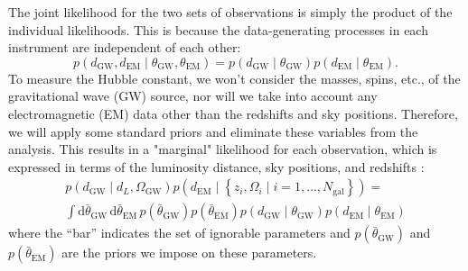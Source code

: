 \documentclass[modern]{article}
\newcommand{\dd}{\mathrm{d}}
\newcommand{\dEM}{d_{\mathrm{EM}}}
\newcommand{\dGW}{d_{\mathrm{GW}}}
\newcommand{\Ngal}{N_{\mathrm{gal}}}
\newcommand{\OGW}{\Omega_{\mathrm{GW}}}
\newcommand{\thetaEM}{\theta_{\mathrm{EM}}}
\newcommand{\thetaGW}{\theta_{\mathrm{GW}}}
\begin{document}
The joint likelihood for the two sets of observations is simply the product of the individual likelihoods. This is because the data-generating processes in each instrument are independent of each other:
%
\begin{equation}
    p\left( \dGW, \dEM \mid \thetaGW, \thetaEM \right) =  p\left( \dGW \mid \thetaGW \right) p\left( \dEM \mid \thetaEM \right).
\end{equation}
%
To measure the Hubble constant, we won't consider the masses, spins, etc., of the gravitational wave (GW) source, nor will we take into account any electromagnetic (EM) data other than the redshifts and sky positions. Therefore, we will apply some standard priors and eliminate these variables from the analysis. This results in a "marginal" likelihood for each observation, which is expressed in terms of the luminosity distance, sky positions, and redshifts \cite{Abbott2016Rate}:
%
\begin{multline}
    p\left( \dGW \mid d_L, \OGW \right) p\left( \dEM \mid \left\{ z_i, \Omega_i \mid i = 1, \ldots, \Ngal \right\} \right) = \\ \int \dd \bar{\theta}_{\mathrm{GW}} \, \dd \bar{\theta}_{\mathrm{EM}} \, p\left( \bar{\theta}_{\mathrm{GW}} \right) p\left( \bar{\theta}_{\mathrm{EM}} \right) p\left( \dGW \mid \thetaGW \right) p\left( \dEM \mid \thetaEM \right)
\end{multline}
%
where the ``bar'' indicates the set of ignorable parameters and $p\left(
\bar{\theta}_{\mathrm{GW}} \right)$ and $p\left( \bar{\theta}_{\mathrm{EM}}
\right)$ are the priors we impose on these parameters.
\end{document}
